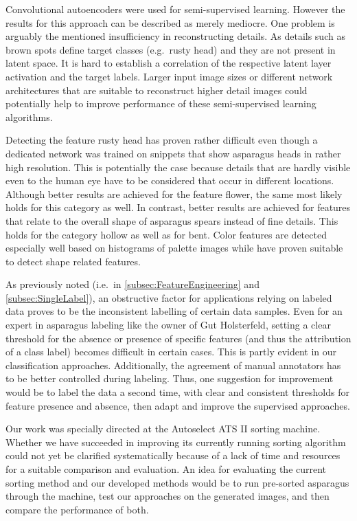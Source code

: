 \bigskip
Convolutional autoencoders were used for semi-supervised learning. However the results for this approach can be described as merely mediocre. One problem is arguably the mentioned insufficiency in reconstructing details. As details such as brown spots define target classes (e.g.\ rusty head) and they are not present in latent space. It is hard to establish a correlation of the respective latent layer activation and the target labels. Larger input image sizes or different network architectures that are suitable to reconstruct higher detail images could potentially help to improve performance of these semi-supervised learning algorithms.

\bigskip
Detecting the feature rusty head has proven rather difficult even though a dedicated network was trained on snippets that show asparagus heads in rather high resolution. This is potentially the case because details that are hardly visible even to the human eye have to be considered that occur in different locations. Although better results are achieved for the feature flower, the same most likely holds for this category as well. In contrast, better results are achieved for features that relate to the overall shape of asparagus spears instead of fine details. This holds for the category hollow as well as  for bent. Color features are detected especially well based on histograms of palette images while  have proven suitable to detect shape related features.

As previously noted (i.e.\ in \autoref{subsec:FeatureEngineering} and \autoref{subsec:SingleLabel}), an obstructive factor for applications relying on labeled data proves to be the inconsistent labelling of certain data samples. Even for an expert in asparagus labeling like the owner of Gut Holsterfeld, setting a clear threshold for the absence or presence of specific features (and thus the attribution of a class label) becomes difficult in certain cases. This is partly evident in our classification approaches. Additionally, the agreement of manual annotators has to be better controlled during labeling. Thus, one suggestion for improvement would be to label the data a second time, with clear and consistent thresholds for feature presence and absence, then adapt and improve the supervised approaches.

\bigskip
Our work was specially directed at the Autoselect ATS II sorting machine. Whether we have succeeded in improving its currently running sorting algorithm could not yet be clarified systematically because of a lack of time and resources for a suitable comparison and evaluation. An idea for evaluating the current sorting method and our developed methods would be to run pre-sorted asparagus through the machine, test our approaches on the generated images, and then compare the performance of both. 

